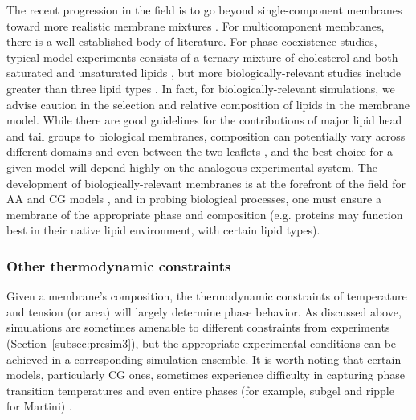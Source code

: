\documentclass[9pt,bestpractices]{livecoms}
\begin{document}
The recent progression in the field is to go beyond single-component membranes toward more realistic membrane mixtures \cite{Khakbaz2015}.
For multicomponent membranes, there is a well established body of literature.
For phase coexistence studies, typical model experiments consists of a ternary mixture of cholesterol and both saturated and unsaturated lipids \cite{Berkowitz2009}, but more biologically-relevant studies include greater than three lipid types \cite{Khakbaz2015}.
In fact, for biologically-relevant simulations, we advise caution in the selection and relative composition of lipids in the membrane model.
While there are good guidelines for the contributions of major lipid head and tail groups to biological membranes, composition can potentially vary across different domains and even between the two leaflets \cite{Ing??lfsson2014}, and the best choice for a given model will depend highly on the analogous experimental system.
The development of biologically-relevant membranes is at the forefront of the field for AA and CG models \cite{Khakbaz2015,Monje-Galvan2015}, and in probing biological processes, one must ensure a membrane of the appropriate phase and composition (e.g. proteins may function best in their native lipid environment, with certain lipid types).

\subsubsection{Other thermodynamic constraints}
\label{subsubsec:constraints}
Given a membrane's composition, the thermodynamic constraints of temperature and tension (or area) will largely determine phase behavior.
As discussed above, simulations are sometimes amenable to different constraints from experiments (Section~\ref{subsec:presim3}), but the appropriate experimental conditions can be achieved in a corresponding simulation ensemble.
It is worth noting that certain models, particularly CG ones, sometimes experience difficulty in capturing phase transition temperatures and even entire phases (for example, subgel and ripple for Martini) \cite{Rodgers2012}.
\end{document}
